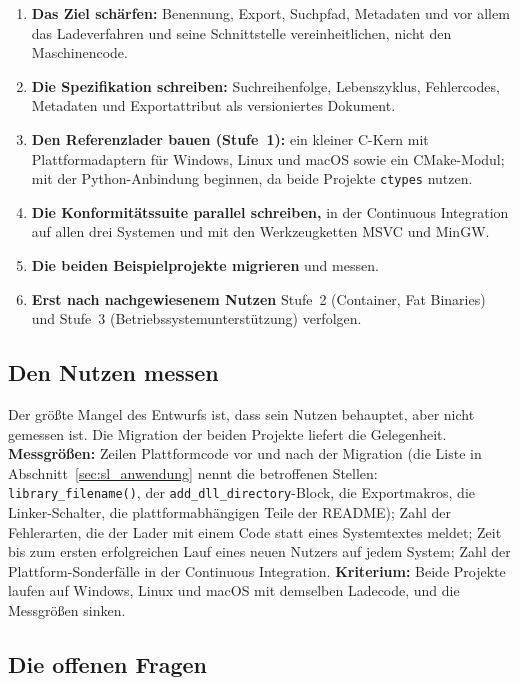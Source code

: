 \begin{enumerate}
	\item \textbf{Das Ziel schärfen:} Benennung, Export, Suchpfad, Metadaten und vor allem das Ladeverfahren und seine Schnittstelle vereinheitlichen, nicht den Maschinencode.
	\item \textbf{Die Spezifikation schreiben:} Suchreihenfolge, Lebenszyklus, Fehlercodes, Metadaten und Exportattribut als versioniertes Dokument.
	\item \textbf{Den Referenzlader bauen (Stufe~1):} ein kleiner C-Kern mit Plattformadaptern für Windows, Linux und macOS sowie ein CMake-Modul; mit der Python-Anbindung beginnen, da beide Projekte \texttt{ctypes} nutzen.
	\item \textbf{Die Konformitätssuite parallel schreiben,} in der Continuous Integration auf allen drei Systemen und mit den Werkzeugketten MSVC und MinGW.
	\item \textbf{Die beiden Beispielprojekte migrieren} und messen.
	\item \textbf{Erst nach nachgewiesenem Nutzen} Stufe~2 (Container, Fat Binaries) und Stufe~3 (Betriebssystemunterstützung) verfolgen.
\end{enumerate}

\subsection{Den Nutzen messen}

Der größte Mangel des Entwurfs ist, dass sein Nutzen behauptet, aber nicht gemessen ist. Die Migration der beiden Projekte liefert die Gelegenheit. \textbf{Messgrößen:} Zeilen Plattformcode vor und nach der Migration (die Liste in Abschnitt~\ref{sec:sl_anwendung} nennt die betroffenen Stellen: \texttt{library\_filename()}, der \texttt{add\_dll\_directory}-Block, die Exportmakros, die Linker-Schalter, die plattformabhängigen Teile der README); Zahl der Fehlerarten, die der Lader mit einem Code statt eines Systemtextes meldet; Zeit bis zum ersten erfolgreichen Lauf eines neuen Nutzers auf jedem System; Zahl der Plattform-Sonderfälle in der Continuous Integration. \textbf{Kriterium:} Beide Projekte laufen auf Windows, Linux und macOS mit demselben Ladecode, und die Messgrößen sinken.

\subsection{Die offenen Fragen}

